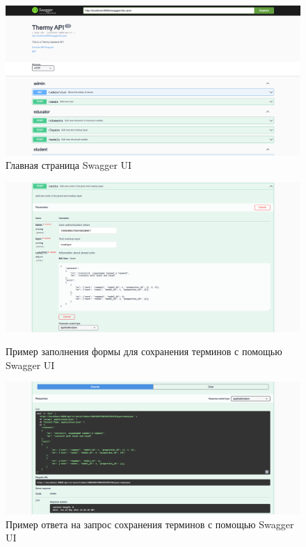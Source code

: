 \begin{figure}[h]
	\centering
	\includegraphics[width=\textwidth ]{img/Swagger/main.png}
	\caption{Главная страница Swagger UI}
	\label{fig:swagger_main}
\end{figure} 
	
\begin{figure}[h]
	\centering
	\includegraphics[width=\textwidth ]{img/Swagger/form_request.png}
	\caption{Пример заполнения формы для сохранения терминов с помощью Swagger UI}
	\label{fig:swagger_form_request}
	
	\centering
	\includegraphics[width=\textwidth ]{img/Swagger/form_response.png}
	\caption{Пример ответа на запрос сохранения терминов с помощью Swagger UI}
	\label{fig:swagger_form_response}
\end{figure} 

